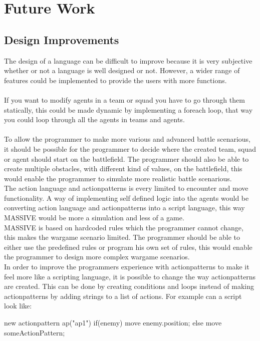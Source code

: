 \chapter{Future Work}
\section{Design Improvements}
The design of a language can be difficult to improve because it is very subjective whether or not a language is well designed or not. However, a wider range of features could be implemented to provide the users with more functions.\\\\
If you want to modify agents in a team or squad you have to go through them statically, this could be made dynamic by implementing a foreach loop, that way you could loop through all the agents in teams and agents.\\
\\
To allow the programmer to make more various and advanced battle scenarious, it should be possible for the programmer to decide where the created team, squad or agent should start on the battlefield. The programmer should also be able to create multiple obstacles, with different kind of values, on the battlefield, this would enable the programmer to simulate more realistic battle scenarious.\\

The action language and actionpatterns is every limited to encounter and move functionality. A way of implementing self defined logic into the agents would be converting action language and actionpatterns into a script language, this way MASSIVE would be more a simulation and less of a game.\\

MASSIVE is based on hardcoded rules which the programmer cannot change, this makes the wargame scenario limited. The programmer should be able to either use the predefined rules or program his own set of rules, this would enable the programmer to design more complex wargame scenarios. \\

In order to improve the programmers experience with actionpatterns to make it feel more like a scripting language, it is possible to change the way actionpatterns are created. This can be done by creating conditions and loops instead of making actionpatterns by adding strings to a list of actions. For example can a script look like:
\begin{source}{}{}
new actionpattern ap("ap1")
{
	if(enemy)
	{
		move enemy.position;
	}
	else
	{
		move someActionPattern;
	}
}
\end{source}

